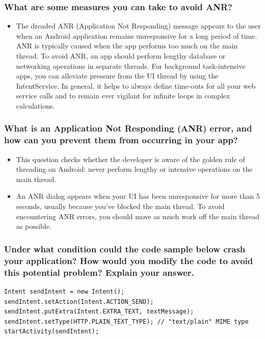 \documentclass[9pt, b5paper]{article}
\begin{document}
\subsubsection{What are some measures you can take to avoid ANR?}
\label{sec-1-6-3}
\begin{itemize}
\item The dreaded ANR (Application Not Responding) message appears to the user when an Android application remains unresponsive for a long period of time. ANR is typically caused when the app performs too much on the main thread. To avoid ANR, an app should perform lengthy database or networking operations in separate threads. For background task-intensive apps, you can alleviate pressure from the UI thread by using the IntentService. In general, it helps to always define time-outs for all your web service calls and to remain ever vigilant for infinite loops in complex calculations.
\end{itemize}

\subsubsection{What is an Application Not Responding (ANR) error, and how can you prevent them from occurring in your app?}
\label{sec-1-6-4}
\begin{itemize}
\item This question checks whether the developer is aware of the golden rule of threading on Android: never perform lengthy or intensive operations on the main thread.
\item An ANR dialog appears when your UI has been unresponsive for more than 5 seconds, usually because you've blocked the main thread. To avoid encountering ANR errors, you should move as much work off the main thread as possible.
\end{itemize}

\subsubsection{Under what condition could the code sample below crash your application? How would you modify the code to avoid this potential problem? Explain your answer.}
\label{sec-1-6-5}
\begin{verbatim}
Intent sendIntent = new Intent();
sendIntent.setAction(Intent.ACTION_SEND);
sendIntent.putExtra(Intent.EXTRA_TEXT, textMessage);
sendIntent.setType(HTTP.PLAIN_TEXT_TYPE); // "text/plain" MIME type
startActivity(sendIntent);
\end{verbatim}
\end{document}
